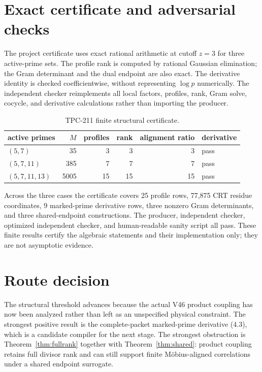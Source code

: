 \documentclass[11pt]{article}
\begin{document}
\section{Exact certificate and adversarial checks}

The project certificate uses exact rational arithmetic at cutoff $z=3$ for
three active-prime sets.  The profile rank is computed by rational Gaussian
elimination; the Gram determinant and the dual endpoint are also exact.
The derivative identity is checked coefficientwise, without representing
$\log p$ numerically.  The independent checker reimplements all local factors,
profiles, rank, Gram solve, cocycle, and derivative calculations rather than
importing the producer.

\begin{table}[t]
\centering
\caption{TPC-211 finite structural certificate.}
\label{tab:certificate}
\begin{tabular}{@{}lrrrrl@{}}
\toprule
active primes & $M$ & profiles & rank & alignment ratio & derivative \\
\midrule
$(5,7)$ & 35 & 3 & 3 & 3 & pass \\
$(5,7,11)$ & 385 & 7 & 7 & 7 & pass \\
$(5,7,11,13)$ & 5005 & 15 & 15 & 15 & pass \\
\bottomrule
\end{tabular}
\end{table}

Across the three cases the certificate covers 25 profile rows, 77,875 CRT
residue coordinates, 9 marked-prime derivative rows, three nonzero Gram
determinants, and three shared-endpoint constructions.  The producer,
independent checker, optimized independent checker, and human-readable sanity
script all pass.  These finite results certify the algebraic statements and
their implementation only; they are not asymptotic evidence.

\section{Route decision}

The structural threshold advances because the actual V46 product coupling has
now been analyzed rather than left as an unspecified physical constraint.
The strongest positive result is the complete-packet marked-prime derivative
(4.3), which is a candidate compiler for the next stage.  The strongest
obstruction is Theorem~\ref{thm:fullrank} together with
Theorem~\ref{thm:shared}: product coupling retains full divisor rank and can
still support finite M\"obius-aligned correlations under a shared endpoint
surrogate.
\end{document}

